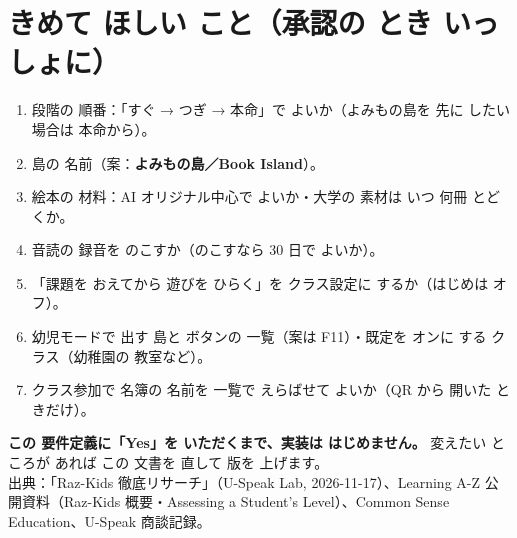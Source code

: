 \documentclass[a4paper,10pt]{article}
\begin{document}
\section{きめて ほしい こと（承認の とき いっしょに）}
\begin{enumerate}
\item 段階の 順番：「すぐ → つぎ → 本命」で よいか（よみもの島を 先に したい 場合は 本命から）。
\item 島の 名前（案：\textbf{よみもの島／Book Island}）。
\item 絵本の 材料：AI オリジナル中心で よいか・大学の 素材は いつ 何冊 とどくか。
\item 音読の 録音を のこすか（のこすなら 30 日で よいか）。
\item 「課題を おえてから 遊びを ひらく」を クラス設定に するか（はじめは オフ）。
\item 幼児モードで 出す 島と ボタンの 一覧（案は F11）・既定を オンに する クラス（幼稚園の 教室など）。
\item クラス参加で 名簿の 名前を 一覧で えらばせて よいか（QR から 開いた ときだけ）。
\end{enumerate}

\begin{note}
\textbf{この 要件定義に「Yes」を いただくまで、実装は はじめません。} 変えたい ところが あれば この 文書を 直して 版を 上げます。\\
出典：「Raz-Kids 徹底リサーチ」（U-Speak Lab, 2026-11-17）、Learning A-Z 公開資料（Raz-Kids 概要・Assessing a Student's Level）、Common Sense Education、U-Speak 商談記録。
\end{note}
\end{document}
